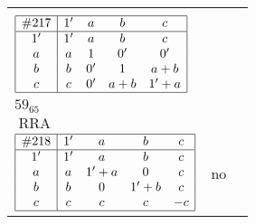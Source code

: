 \documentclass[12pt]{article}
\theoremstyle{definition}
\newcommand\RRA{\operatorname{RRA}}
\newcommand{\join}{\mathbin{+}}%
\newcommand{\id}{{1'}}%
\renewcommand{\div}{0'}
\renewcommand{\top}{1}%
\begin{document}
\begin{center}
\begin{longtable}{l|c|c}
{\begin{tikzpicture}[<->,shorten <=1pt,shorten >=1pt,label distance=0mm, font=\small]
\end{tikzpicture}
}      \\[15mm]

$
\begin{array}{|c|cccc|} \hline
\#217 & \id & a & b & c \\ \hline
\id & \id & a & b & c \\
a & a & \top & \div & \div \\
b & b & \div & \top & a \join b \\
c & c & \div & a \join b & \id \join a \\ \hline
\end{array}
$
 & \begin{tabular}{c} yes \\ $59_{65}$ \\ $\RRA$ \end{tabular} 
 & \adjustbox{valign=c, max height=1.6cm}{$
\left[ \begin{array}{cccccc}
\id & a & a & b & c & a \\ 
a & \id & a & a & a & c \\ 
a & a & \id & b & b & b \\ 
b & a & b & \id & b & b \\ 
c & a & b & b & \id & c \\ 
a & c & b & b & c & \id
\end{array}\right]
$}     \\[15mm]

$
\begin{array}{|c|cccc|} \hline
\#218 & \id & a & b & c \\ \hline
\id & \id & a & b & c \\
a & a & \id \join a & 0 & c \\
b & b & 0 & \id \join b & c \\
c & c & c & c & -c \\ \hline
\end{array}
$
 & no  
 & \adjustbox{valign=c, max height=1.6cm}{$
\left[ \begin{array}{cccccc}
\id & a & a & c & c & c \\ 
a & \id & a & c & c & c \\ 
a & a & \id & c & c & c \\ 
c & c & c & \id & b & b \\ 
c & c & c & b & \id & b \\ 
c & c & c & b & b & \id
\end{array}\right]
$}     \\[15mm]


\end{longtable}
\end{center}
\end{document}
